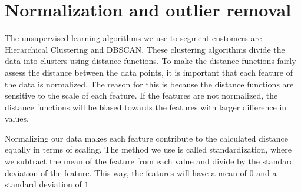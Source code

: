 \section{Normalization and outlier removal}

The unsupervised learning algorithms we use to segment customers are Hierarchical Clustering and \linebreak DBSCAN. These clustering algorithms divide the data into clusters using distance functions. To make the distance functions fairly assess the distance between the data points, it is important that each feature of the data is normalized. The reason for this is because the distance functions are sensitive to the scale of each feature. If the features are not normalized, the distance functions will be biased towards the features with larger difference in values. 
\par 
Normalizing our data makes each feature contribute to the calculated distance equally in terms of scaling. The method we use is called standardization, where we subtract the mean of the feature from each value and divide by the standard deviation of the feature. This way, the features will have a mean of $0$ and a standard deviation of $1$.